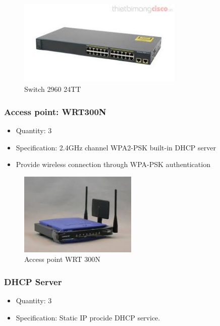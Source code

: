 \begin{figure}[H]
  \centering
  \includegraphics[width=0.7\textwidth]{./assets/switch.png}
  \caption{Switch 2960 24TT}
\end{figure}

\subsubsection{Access point: WRT300N}
\begin{itemize}
  \item Quantity: 3
  \item Specification: 2.4GHz channel WPA2-PSK built-in DHCP server

  \item Provide wireless connection through WPA-PSK authentication
\end{itemize}

\begin{figure}[H]
  \centering
  \includegraphics[width=0.5\textwidth]{./assets/wireless_router.png}
  \caption{Access point WRT 300N}
\end{figure}

\subsubsection{DHCP Server}
\begin{itemize}
  \item Quantity: 3
  \item Specification: Static IP procide DHCP service.
\end{itemize}

